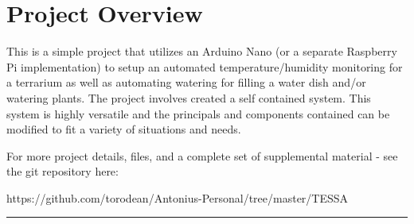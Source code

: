 \documentclass{article}
\begin{document}
		\section{Project Overview}
		This is a simple project that utilizes an Arduino Nano (or a separate Raspberry Pi implementation) to setup an automated temperature/humidity monitoring for a terrarium as well as automating watering for filling a water dish and/or watering plants. The project involves created a self contained system. This system is highly versatile and the principals and components contained can be modified to fit a variety of situations and needs.

		For more project details, files, and a complete set of supplemental material - see the git repository here:
		\begin{mdframed}[backgroundcolor=gray!08, linewidth=1pt]
			https://github.com/torodean/Antonius-Personal/tree/master/TESSA
		\end{mdframed}
	
	\hrule
\end{document}

